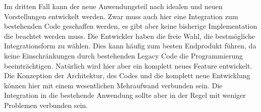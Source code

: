 Im dritten Fall kann der neue Anwendungsteil nach idealen und neuen Vorstellungen entwickelt werden. Zwar muss auch hier eine Integration zum bestehenden Code geschaffen werden, es gibt aber keine bisherige Implementation die beachtet werden muss. Die Entwickler haben die freie Wahl, die bestmögliche Integrationsform zu wählen. Dies kann häufig zum besten Endprodukt führen, da keine Einschränkungen durch bestehenden Legacy Code die Programmierung beeinträchtigen. Natürlich wird hier aber ein komplett neues Feature entwickelt. Die Konzeption der Architektur, des Codes und die komplett neue Entwicklung können hier mit einem wesentlichen Mehraufwand verbunden sein. Die Integration in die bestehende Anwendung sollte aber in der Regel mit weniger Problemen verbunden sein.

